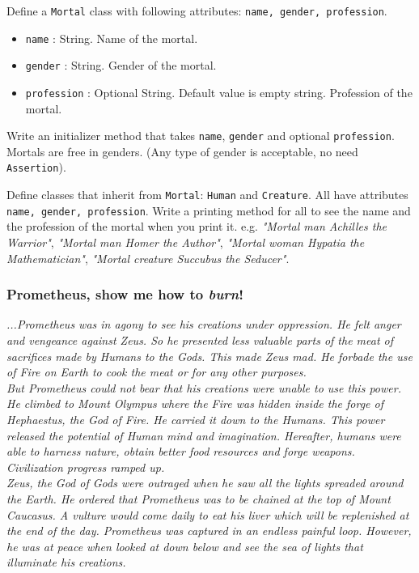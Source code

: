 \documentclass[a4paper]{article}
\begin{document}
Define a \texttt{Mortal} class with following attributes: \texttt{name, gender, profession}.

\begin{itemize}
    \item \texttt{name} : String. Name of the mortal.
    \item \texttt{gender} : String. Gender of the mortal.
    \item \texttt{profession} : Optional String. Default value is empty string. Profession of the mortal.
\end{itemize}

Write an initializer method that takes \texttt{name}, \texttt{gender} and optional \texttt{profession}. Mortals are free in genders. (Any type of gender is acceptable, no need \texttt{Assertion}).

Define classes that inherit from \texttt{Mortal}: \texttt{Human} and \texttt{Creature}. All have attributes \texttt{name, gender, profession}. Write a printing method for all to see the name and the profession of the mortal when you print it. e.g. \textit{"Mortal man Achilles the Warrior"}, \textit{"Mortal man Homer the Author"}, \textit{"Mortal woman Hypatia the Mathematician"}, \textit{"Mortal creature Succubus the Seducer"}.

\subsubsection{Prometheus, show me how to \textit{burn}!}

\textit{...Prometheus was in agony to see his creations under oppression. He felt anger and vengeance against Zeus. So he presented less valuable parts of the meat of sacrifices made by Humans to the Gods. This made Zeus mad. He forbade the use of Fire on Earth to cook the meat or for any other purposes.\\
But Prometheus could not bear that his creations were unable to use this power. He climbed to Mount Olympus where the Fire was hidden inside the forge of Hephaestus, the God of Fire. He carried it down to the Humans. This power released the potential of Human mind and imagination. Hereafter, humans were able to harness nature, obtain better food resources and forge weapons. Civilization progress ramped up.\\
Zeus, the God of Gods were outraged when he saw all the lights spreaded around the Earth. He ordered that Prometheus was to be chained at the top of Mount Caucasus. A vulture would come daily to eat his liver which will be replenished at the end of the day. Prometheus was captured in an endless painful loop. However, he was at peace when looked at down below and see the sea of lights that illuminate his creations.}
\end{document}
